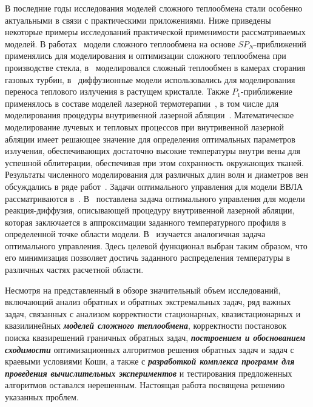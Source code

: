     В последние годы исследования моделей сложного теплообмена стали
    особенно актуальными в связи с практическими приложениями.
    Ниже приведены некоторые примеры исследований практической применимости
    рассматриваемых моделей.
    В работах~\cite{clever2012optimal, clever2014model,
        frank2010optimal, klar2005, lang2005adaptive, farina2011mathematical,
        Thommes2002, Pinnau2007b, Pinnau2004, Seaid2007, Larsen2002}
    модели сложного теплообмена на основе $SP_N$-приближений
    применялись для моделирования и оптимизации сложного теплообмена при
    производстве стекла, в~\cite{frank2004comparison, seaid2004efficient, Seaid2005}
    моделировался сложный теплообмен в
    камерах сгорания газовых турбин, в~\cite{Backofen2004} диффузионные модели
    использовались для моделирования переноса теплового излучения в
    растущем кристалле.
    Также $P_1$-приближение применялось в составе моделей
    лазерной термотерапии~\cite{Dombrovskii2015, Tse2012, Hubner2017},
    в том числе для моделирования процедуры  внутривенной лазерной
    абляции~\cite{Endovenous_vandenBos2009}.
    Математическое моделирование лучевых и тепловых процессов
    при внутривенной лазерной абляции имеет решающее значение для определения оптимальных
    параметров излучения, обеспечивающих достаточно высокие температуры
    внутри вены для успешной облитерации, обеспечивая при этом сохранность
    окружающих тканей.
    Результаты численного моделирования для различных
    длин волн и диаметров вен обсуждались в ряде
    работ~\cite{van2014optical, Some_Poluektova2014, Endovenous_Malskat2014, Mathematical_Mordon2006}.
    Задачи оптимального управления для модели ВВЛА рассматриваются
    в~\cite{Optimal_Kovtanyuk2020, Inverse_Kovtanyuk2021}.
    В~\cite{Optimal_Kovtanyuk2020} поставлена задача оптимального
    управления для модели реакция-диффузия,
    описывающей процедуру внутривенной лазерной абляции, которая заключается в
    аппроксимации заданного температурного профиля в определенной точке
    области модели.
    В~\cite{Inverse_Kovtanyuk2021} изучается аналогичная задача оптимального управления.
    Здесь целевой функционал выбран таким образом, что его
    минимизация позволяет достичь заданного распределения температуры в
    различных частях расчетной области.


    Несмотря на представленный в обзоре значительный объем исследований,
    включающий анализ обратных и обратных экстремальных задач, ряд важных
    задач, связанных с анализом корректности стационарных,
    квазистационарных и квазилинейных \textit{\textbf{моделей сложного теплообмена}},
    корректности постановок поиска квазирешений граничных обратных задач,
    \textit{\textbf{построением и обоснованием сходимости}} оптимизационных алгоритмов
    решения обратных задач и задач с краевыми условиями Коши, а также с
    \textit{\textbf{разработкой комплекса программ для проведения вычислительных экспериментов}}
    и тестирования предложенных алгоритмов оставался нерешенным.
    Настоящая работа посвящена решению указанных проблем.


